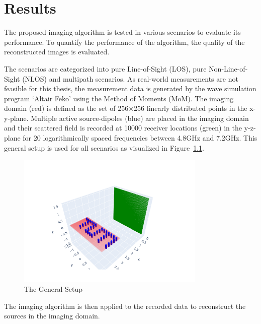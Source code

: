 
\chapter{Results}\label{chapter:results}
The proposed imaging algorithm is tested in various scenarios to evaluate its performance.
To quantify the performance of the algorithm, the quality of the reconstructed images is evaluated.


The scenarios are categorized into pure Line-of-Sight (LOS), pure Non-Line-of-Sight (NLOS) and multipath scenarios.
As real-world measurements are not feasible for this thesis, the measurement data is generated by the wave simulation program `Altair Feko' using the Method of Moments (MoM).
The imaging domain (red) is defined as the set of 256\(\times \)256 linearly distributed points in the x-y-plane.
Multiple active source-dipoles (blue) are placed in the imaging domain and their scattered field is recorded at 10000 receiver locations (green) in the y-z-plane for 20 logarithmically spaced frequencies between 4.8GHz and 7.2GHz.
This general setup is used for all scenarios as visualized in Figure~\ref{fig:general_setup}.

\begin{figure}[ht]
    \centering
    \includegraphics[width=0.8\textwidth]{figures/general_setup.pdf}
    \caption{The General Setup}\label{fig:general_setup}
\end{figure}


The imaging algorithm is then applied to the recorded data to reconstruct the sources in the imaging domain.


